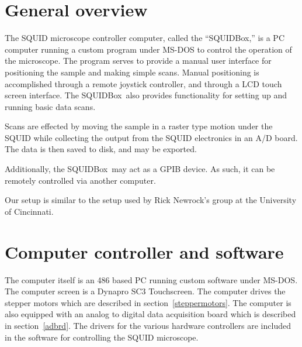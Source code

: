 %
%
%
%
%

\newcommand{\squidbox}{SQUIDBox}

\section{General overview}

The SQUID microscope controller computer, called the ``\squidbox,'' 
is a PC computer 
running a custom program under MS-DOS to control the operation
of the microscope. The program serves to provide a manual user
interface for positioning the sample and making simple scans. 
Manual positioning
is accomplished through a remote joystick controller, and 
through a LCD touch screen interface. The \squidbox\ also provides
functionality for setting up and running basic data scans.

Scans are effected by moving the sample in a raster type motion
under the SQUID while collecting the output from the SQUID electronics
in an A/D board. The data is then saved to disk, and may be exported. 

Additionally, the \squidbox\ may act as a GPIB
device. As such, it can be remotely controlled via another
computer. 

Our setup is similar to the setup used by Rick Newrock's group
at the University of Cincinnati. 

\section{Computer controller and software}

The computer itself is an  486 based PC running custom software
under MS-DOS. The computer screen is a Dynapro SC3
Touchscreen\cite{dynapro_touchscreen}. 
The computer drives the stepper motors which are described in
section~\ref{steppermotors}. 
The computer is also equipped with an
analog to digital data acquisition board which is described in 
section~\ref{adbrd}.  
The drivers for the various hardware controllers are included in the 
software for
controlling the SQUID microscope. 

